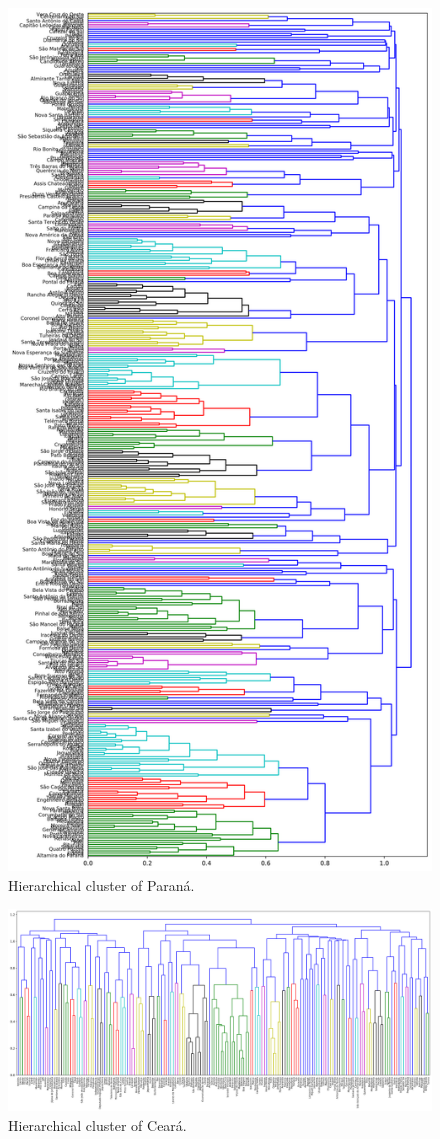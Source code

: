 \documentclass[12pt]{report}
\begin{document}
\begin{figure}[h!]
 \centering
 \includegraphics[height=\textheight]{clusterPR_06.png}
 \caption{Hierarchical cluster of Paraná.}
 \label{fig:cluster_pr}
\end{figure}

\begin{figure}[h!]
 \centering
 \includegraphics[width=\textwidth]{clusterCE_06.png}
 \caption{Hierarchical cluster of Ceará.}
 \label{fig:cluster_ce}
\end{figure}
\end{document}
